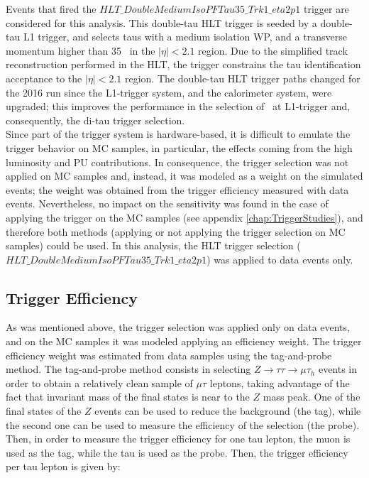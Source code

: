 \noindent Events that fired the $HLT\_DoubleMediumIsoPFTau35\_Trk1\_eta2p1$ trigger are considered 
for this analysis. This double-tau HLT trigger is seeded by a double-tau L1 trigger, and selects
 taus with a medium isolation WP, and a transverse momentum higher than 35 \GeV~in the
$|\eta| < 2.1$ region. Due to the simplified track reconstruction 
performed in the HLT, the trigger constrains the tau identification 
acceptance to the $|\eta| < 2.1$ region. The double-tau HLT trigger paths 
changed for the 2016 run since the L1-trigger system, and the calorimeter system,
were upgraded; this improves the performance in the selection 
of \tauh~at L1-trigger and, consequently, the di-tau trigger selection. \\

\noindent Since part of the trigger system is hardware-based, it is difficult to emulate 
the trigger behavior on MC samples, in particular, the effects coming from the high luminosity
and PU contributions. In consequence, the trigger selection was not 
applied on MC samples and, instead, it was modeled as a weight on the 
simulated events; the weight was obtained from the trigger efficiency 
measured with data events. Nevertheless, no impact on the sensitivity
was found in the case of applying the trigger on the MC samples (see appendix \ref{chap:TriggerStudies}), and 
therefore both methods (applying or not applying the trigger selection on MC samples) could 
be used. In this analysis, the HLT trigger selection ($HLT\_DoubleMediumIsoPFTau35\_Trk1\_eta2p1$) was
applied to data events only.\\

\subsection{Trigger Efficiency}
\label{subsec:TriggerEff}

As was mentioned above, the trigger selection was applied only on data events, and 
on the MC samples it was modeled applying an efficiency weight. The trigger efficiency 
weight was estimated from data samples using the tag-and-probe method. The tag-and-probe 
method consists in selecting $Z \rightarrow \tau\tau \rightarrow \mu\tau_{h}$ events in order to 
obtain a relatively clean sample of $\mu\tau$ leptons, taking advantage of 
the fact that invariant mass of the final states is near to the $Z$ mass peak. One of the 
final states of the $Z$ events can be used to reduce the background (the tag), while 
the second one can be used to measure the efficiency of the 
selection (the probe). Then, in order to measure the trigger efficiency for one 
tau lepton, the muon is used as the tag, while the 
tau is used as the probe. Then, the trigger efficiency per tau lepton is given by:

